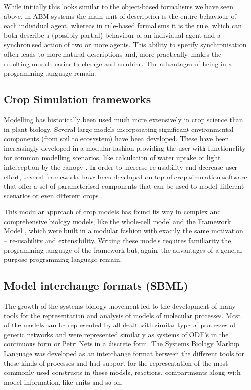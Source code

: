 While initially this looks similar to the object-based formalisms we have seen
above, in ABM systems the main unit of description is the entire behaviour of
each individual agent, whereas in rule-based formalisms it is the rule, which
can both describe a (possibly partial) behaviour of an individual agent and a
synchronised action of two or more agents. This ability to specify
synchronisation often leads to more natural descriptions and, more practically,
makes the resulting models easier to change and combine. The advantages of being
in a programming language remain.

\subsection{Crop Simulation frameworks}
Modelling has historically been used much more extensively in crop science than
in plant biology. Several large models incorporating significant environmental
components (from soil to ecosystem) have been developed. These have been
increasingly developed in a modular fashion providing the user with
functionality for common modelling scenarios, like calculation of water uptake
or light interception by the canopy \citep{keating_overview_2003}. In order to
increase re-usability and decrease user effort, several frameworks have been
developed on top of crop simulation software that offer a set of parameterised
components that can be used to model different scenarios or even different crops
\citep{brown_plant_2014}.

This modular approach of crop models has found its way in complex and
comprehensive biology models, like the \citet{karr_whole-cell_2012} whole-cell
model and the Framework Model \citep{chew2014multiscale}, which were built in a
modular fashion with exactly the same motivation -- re-usability and
extensibility. Writing these models requires familiarity the programming
language of the framework but, again, the advantages of a general-purpose
programming language remain.


\subsection{Model interchange formats (SBML)}
The growth of the systems biology movement led to the development of many tools
for the representation and analysis of models of molecular processes. Most of
the models can be represented by all dealt with similar type of processes of
genetic networks and were represented similarly as systems of ODE's in the
continuous form or Petri Nets in a discrete form. The Systems Biology Markup
Language \citep[SBML;][]{hucka_systems_2003} was developed as an interchange
format between the different tools for these kinds of processes and had support
for the representation of the most commonly used constructs in these models,
reactions, compartments along with model information, like units and so on.

